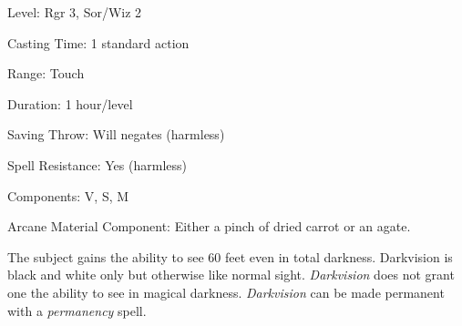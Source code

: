 
\begin{description*}
\item[Level:] Rgr 3, Sor/Wiz 2
\item[Casting Time:] 1 standard action
\item[Range:] Touch
\item[Duration:] 1 hour/level
\item[Saving Throw:] Will negates (harmless)
\item[Spell Resistance:] Yes (harmless)
\item[Components:] V, S, M
\item[Arcane Material Component:] Either a pinch of dried carrot or an agate.
\end{description*}

The subject gains the ability to see 60 feet even in total darkness. Darkvision
is black and white only but otherwise like normal sight. \textit{Darkvision} does
not grant one the ability to see in magical darkness.
\textit{Darkvision} can be made permanent with a \textit{permanency} spell.